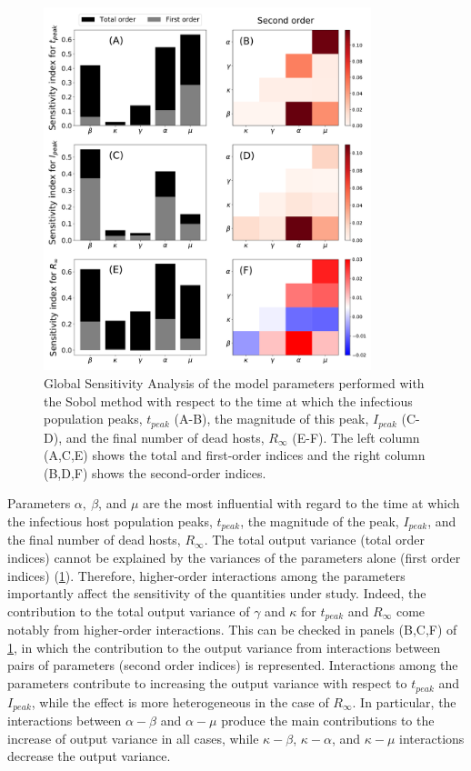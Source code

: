 \begin{figure}[H]
    \centering
    \includegraphics[width=0.85\textwidth]{Figures/GSA.pdf}
    \caption[Global Sensitivity Analysis of the model]{Global Sensitivity
        Analysis of the model parameters performed
        with the Sobol method with respect to the time at which the infectious
        population peaks, $t_{peak}$ (A-B), the magnitude of this peak,
        $I_{peak}$ (C-D), and the final number of dead hosts, $R_{\infty}$
        (E-F). The left column (A,C,E) shows the total and first-order indices
        and the right column (B,D,F) shows the second-order indices.}
    \label{fig:GSA}
\end{figure}

Parameters $\alpha, \ \beta$, and $\mu$ are the most influential with regard
to the time at which the infectious host population peaks, $t_{peak}$, the
magnitude of the peak, $I_{peak}$, and the final number of dead hosts,
$R_{\infty}$. The total output variance (total order indices) cannot be
explained by the variances of the parameters alone (first order indices)
(\cref{fig:GSA}). Therefore, higher-order interactions among the parameters
importantly affect the sensitivity of the quantities under study. Indeed, the
contribution to the total output variance of $\gamma$ and $\kappa$ for
$t_{peak}$ and $R_{\infty}$ come notably from higher-order interactions. This
can be checked in panels (B,C,F) of \cref{fig:GSA}, in which the contribution
to the output variance from interactions between pairs of parameters (second
order indices) is represented. Interactions among the parameters contribute to
increasing the output variance with respect to $t_{peak}$ and $I_{peak}$, while
the effect is more heterogeneous in the case of $R_{\infty}$. In particular,
the interactions between $\alpha-\beta$ and $\alpha-\mu$ produce the main
contributions to the increase of output variance in all cases, while
$\kappa-\beta$, $\kappa-\alpha$, and $\kappa-\mu$ interactions decrease the
output variance.

